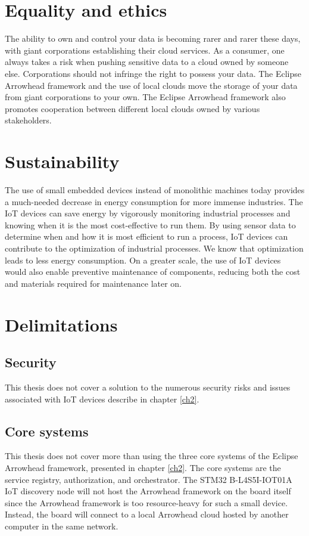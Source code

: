 \section{Equality and ethics}
The ability to own and control your data is becoming rarer and rarer these days, with giant corporations establishing their cloud services.
As a consumer, one always takes a risk when pushing sensitive data to a cloud owned by someone else. Corporations should not infringe the right to possess your data. 
The Eclipse Arrowhead framework and the use of local clouds move the storage of your data from giant corporations to your own.
The Eclipse Arrowhead framework also promotes cooperation between different local clouds owned by various stakeholders. 
\section{Sustainability}
The use of small embedded devices instead of monolithic machines today provides a much-needed decrease in energy consumption for more immense industries.
The IoT devices can save energy by vigorously monitoring industrial processes and knowing when it is the most cost-effective to run them.
By using sensor data to determine when and how it is most efficient to run a process, IoT devices can contribute to the optimization of industrial processes.
We know that optimization leads to less energy consumption.
On a greater scale, the use of IoT devices would also enable preventive maintenance of components, reducing both the cost and materials required for maintenance later on.
\section{Delimitations}
\subsection{Security}
This thesis does not cover a solution to the numerous security risks and issues associated with IoT devices describe in chapter \ref{ch2}. 
\subsection{Core systems}
This thesis does not cover more than using the three core systems of the Eclipse Arrowhead framework, presented in chapter \ref{ch2}. The core systems are the service registry, authorization, and orchestrator. 
The STM32 B-L4S5I-IOT01A IoT discovery node will not host the Arrowhead framework on the board itself since the Arrowhead framework is too resource-heavy for such a small device.
Instead, the board will connect to a local Arrowhead cloud hosted by another computer in the same network. 
